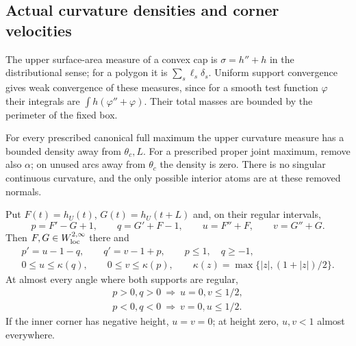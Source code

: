 \subsection{Actual curvature densities and corner velocities}

The upper surface-area measure of a convex cap is
$\sigma=h''+h$ in the distributional sense; for a polygon it is
$\sum_s\ell_s\delta_s$. Uniform support convergence gives weak
convergence of these measures, since for a smooth test function
$\varphi$ their integrals are $\int h(\varphi''+\varphi)$.
Their total masses are bounded by the perimeter of the fixed box.

\begin{theorem}\label{thm:variation-curvature}
For every prescribed canonical full maximum the upper curvature
measure has a bounded density away from $\theta_c,L$.
For a prescribed proper joint maximum, remove also $\alpha$;
on unused arcs away from $\theta_c$ the density is zero.
There is no singular continuous curvature, and the only possible
interior atoms are at these removed normals.

Put $F(t)=h_U(t)$, $G(t)=h_U(t+L)$ and, on their regular intervals,
\begin{equation}\label{eq:variation-velocities}
 p=F'-G+1,\qquad q=G'+F-1,\qquad
 u=F''+F,\qquad v=G''+G.
\end{equation}
Then $F,G\in W^{2,\infty}_{\rm loc}$ there and
\begin{equation}\label{eq:variation-controls}
 \begin{gathered}
 p'=u-1-q,\qquad q'=v-1+p,\qquad p\le1,\quad q\ge-1,\\
 0\le u\le\kappa(q),\qquad0\le v\le\kappa(p),\qquad
 \kappa(z)=\max\{|z|,(1+|z|)/2\}.
 \end{gathered}
\end{equation}
At almost every angle where both supports are regular,
\begin{equation}\label{eq:variation-shadow}
 \begin{array}{ll}
 p>0, q>0\ \Longrightarrow\ u=0, v\le1/2,\\
 p<0, q<0\ \Longrightarrow\ v=0, u\le1/2.
 \end{array}
\end{equation}
If the inner corner has negative height, $u=v=0$; at height zero,
$u,v<1$ almost everywhere.
\end{theorem}

